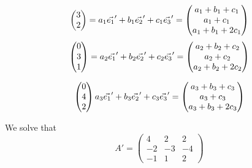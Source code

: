 \begin{homeworkProblem}
\[\begin{pmatrix}
    3 \\
    2
\end{pmatrix}
= a_1\vec{\boldmath{e_1}}' + b_1\vec{\boldmath{e_2}}' + c_1 \vec{\boldmath{e_3}}'
= \begin{pmatrix}
    a_1 + b_1 + c_1 \\
    a_1 + c_1 \\
    a_1 + b_1 + 2c_1
\end{pmatrix}
\]\[
\begin{pmatrix}
    0 \\
    3 \\
    1
\end{pmatrix}
= a_2\vec{\boldmath{e_1}}' + b_2\vec{\boldmath{e_2}}' + c_2 \vec{\boldmath{e_3}}'
= \begin{pmatrix}
    a_2 + b_2 + c_2 \\
    a_2 + c_2 \\
    a_2 + b_2 + 2c_2
\end{pmatrix}
 \]

 \[
\begin{pmatrix}
    0 \\
    4 \\
    2
\end{pmatrix}  a_3\vec{\boldmath{e_1}}' + b_3\vec{\boldmath{e_2}}' + c_3\vec{\boldmath{e_3}}'
= \begin{pmatrix}
    a_3 + b_3 + c_3 \\
    a_3 + c_3 \\
    a_3 + b_3 + 2c_3
\end{pmatrix}
\]

We solve that \[
A' = \begin{pmatrix}
     4 &  2 &  2 \\
    -2 & -3 & -4 \\
    -1 &  1 &  2
\end{pmatrix}\]
\end{homeworkProblem}
